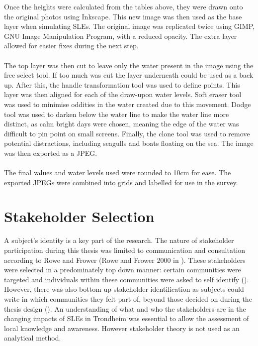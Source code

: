 Once the heights were calculated from the tables above, they were drawn onto the original photos using Inkscape. This new image was then used as the base layer when simulating SLEs. The original image was replicated twice using GIMP, GNU Image Manipulation Program, with a reduced opacity. The extra layer allowed for easier fixes during the next step. 
\paragraph{}
The top layer was then cut to leave only the water present in the image using the free select tool. If too much was cut the layer underneath could be used as a back up. After this, the handle transformation tool was used to define points. This layer was then aligned for each of the draw-upon water levels. Soft eraser tool was used to minimise oddities in the water created due to this movement. Dodge tool was used to darken below the water line to make the water line more distinct, as calm bright days were chosen, meaning the edge of the water was difficult to pin point on small screens. Finally, the clone tool was used to remove potential distractions, including seagulls and boats floating on the sea. The image was then exported as a JPEG. 

\paragraph{}
The final values and water levels used were rounded to 10cm for ease. The exported JPEGs were combined into grids and labelled for use in the survey. 

\section{Stakeholder Selection}
A subject's identity is a key part of the research. The nature of stakeholder participation during this thesis was limited to communication and consultation according to Rowe and Frower  (Rowe and Frower 2000 in \cite{reed_stakeholder_2008}). These stakeholders were selected in a predominately top down manner:  certain communities were targeted and individuals within these communities were asked to self identify (\cite{reed_stakeholder_2008}). However, there was also bottom up stakeholder identification as subjects could write in which communities they felt part of, beyond those decided on during the thesis design (\cite{reed_stakeholder_2008}). An understanding of what and who the stakeholders are in the changing impacts of SLEs in Trondheim was essential to allow the assessment of local knowledge and awareness. However stakeholder theory is not used as an analytical method.
